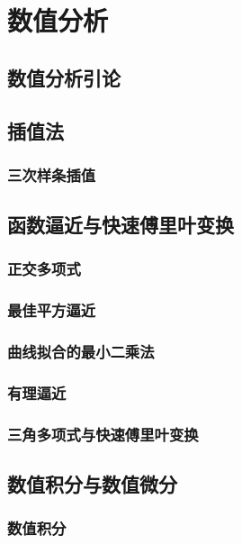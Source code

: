 \part{数值分析}
\chapter{数值分析引论}





\chapter{插值法}





\section{三次样条插值}

\chapter{函数逼近与快速傅里叶变换}

\section{正交多项式}
\section{最佳平方逼近}
\section{曲线拟合的最小二乘法}
\section{有理逼近}
\section{三角多项式与快速傅里叶变换}

\chapter{数值积分与数值微分}
\section{数值积分}

